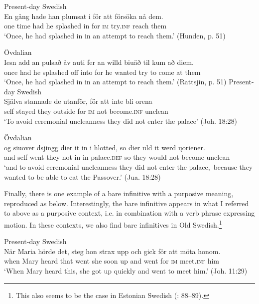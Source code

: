 \documentclass[output=paper]{langscibook}
\begin{document}
\ea
\label{ex:kalm:20}
\ea Present-day Swedish\label{ex:kalm:20a}\\
\gll En gång hade han plumsat i för att försöka nå dem.\\
one time had he splashed in for \textsc{im} try.\textsc{inf} reach them\\ 
\glt ‘Once, he had splashed in in an attempt to reach them.’ (Hunden, p. 51)

\ex Övdalian\label{ex:kalm:20b}\\
\gll Iesn add an pulsað åv auti fer an willd biuäð til kum að diem.\\
once had he splashed off into for he wanted try to come at them\\
\glt ‘Once, he had splashed in in an attempt to reach them.’ (Rattsjin, p. 51)
\z 
\ex
\label{ex:kalm:21}
\ea Present-day Swedish\label{ex:kalm:21a}\\ 
\gll Själva stannade de utanför, för att inte bli orena\\
self stayed they outside for \textsc{im} not become.\textsc{inf} unclean\\
\glt ‘To avoid ceremonial uncleanness they did not enter the palace’ (Joh. 18:28)

\ex Övdalian\label{ex:kalm:21b}\\
\gll og siuover dsjingg dier it in i hlotted, so dier uld it werd \k{u}oriener.\\
and self went they not in in palace.\textsc{def} so they would not become unclean\\
\glt ‘and to avoid ceremonial uncleanness they did not enter the palace,{~}because they wanted to be able to eat the Passover.’ (Jua. 18:28)
\z 
\z 


Finally, there is one example of a bare infinitive with a purposive meaning, reproduced as  below. Interestingly, the bare infinitive appears in what I referred to above as a purposive context, i.e. in combination with a verb phrase expressing motion. In these contexts, we also find bare infinitives in Old Swedish.\footnote{This also seems to be the case in Estonian Swedish (\citealt{Lagman1958}: 88–89).} 


\ea
\label{ex:kalm:22}
\ea Present-day Swedish\label{ex:kalm:22a}\\
\gll När Maria hörde det, steg hon strax upp och gick för att möta honom.\\
when Mary heard that went she soon up and went for \textsc{im} meet.\textsc{inf} him\\
\glt ‘When Mary heard this, she got up quickly and went to meet him.’ (Joh. 11:29)
\end{document}
